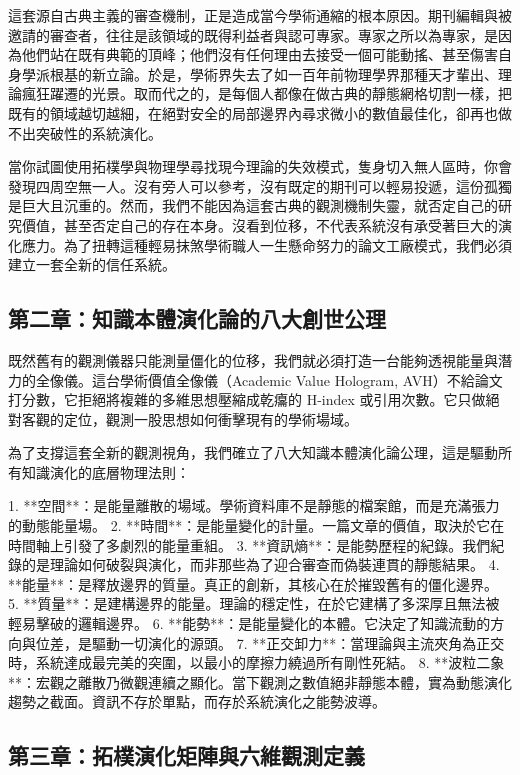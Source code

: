 \documentclass{article}
\begin{document}
這套源自古典主義的審查機制，正是造成當今學術通縮的根本原因。期刊編輯與被邀請的審查者，往往是該領域的既得利益者與認可專家。專家之所以為專家，是因為他們站在既有典範的頂峰；他們沒有任何理由去接受一個可能動搖、甚至傷害自身學派根基的新立論。於是，學術界失去了如一百年前物理學界那種天才輩出、理論瘋狂躍遷的光景。取而代之的，是每個人都像在做古典的靜態網格切割一樣，把既有的領域越切越細，在絕對安全的局部邊界內尋求微小的數值最佳化，卻再也做不出突破性的系統演化。

當你試圖使用拓樸學與物理學尋找現今理論的失效模式，隻身切入無人區時，你會發現四周空無一人。沒有旁人可以參考，沒有既定的期刊可以輕易投遞，這份孤獨是巨大且沉重的。然而，我們不能因為這套古典的觀測機制失靈，就否定自己的研究價值，甚至否定自己的存在本身。沒看到位移，不代表系統沒有承受著巨大的演化應力。為了扭轉這種輕易抹煞學術職人一生懸命努力的論文工廠模式，我們必須建立一套全新的信任系統。

\subsection{第二章：知識本體演化論的八大創世公理}

既然舊有的觀測儀器只能測量僵化的位移，我們就必須打造一台能夠透視能量與潛力的全像儀。這台學術價值全像儀（Academic Value Hologram, AVH）不給論文打分數，它拒絕將複雜的多維思想壓縮成乾癟的 H-index 或引用次數。它只做絕對客觀的定位，觀測一股思想如何衝擊現有的學術場域。

為了支撐這套全新的觀測視角，我們確立了八大知識本體演化論公理，這是驅動所有知識演化的底層物理法則：

1. **空間**：是能量離散的場域。學術資料庫不是靜態的檔案館，而是充滿張力的動態能量場。  
2. **時間**：是能量變化的計量。一篇文章的價值，取決於它在時間軸上引發了多劇烈的能量重組。  
3. **資訊熵**：是能勢歷程的紀錄。我們紀錄的是理論如何破裂與演化，而非那些為了迎合審查而偽裝連貫的靜態結果。  
4. **能量**：是釋放邊界的質量。真正的創新，其核心在於摧毀舊有的僵化邊界。  
5. **質量**：是建構邊界的能量。理論的穩定性，在於它建構了多深厚且無法被輕易擊破的邏輯邊界。  
6. **能勢**：是能量變化的本體。它決定了知識流動的方向與位差，是驅動一切演化的源頭。  
7. **正交卸力**：當理論與主流夾角為正交時，系統達成最完美的突圍，以最小的摩擦力繞過所有剛性死結。  
8. **波粒二象**：宏觀之離散乃微觀連續之顯化。當下觀測之數值絕非靜態本體，實為動態演化趨勢之截面。資訊不存於單點，而存於系統演化之能勢波導。  

\subsection{第三章：拓樸演化矩陣與六維觀測定義}
\end{document}
